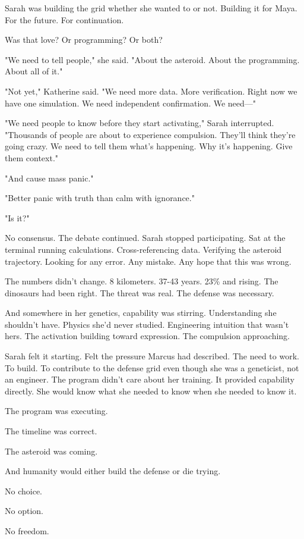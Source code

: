 Sarah was building the grid whether she wanted to or not. Building it for Maya. For the future. For continuation.

Was that love? Or programming? Or both?

"We need to tell people," she said. "About the asteroid. About the programming. About all of it."

"Not yet," Katherine said. "We need more data. More verification. Right now we have one simulation. We need independent confirmation. We need—"

"We need people to know before they start activating," Sarah interrupted. "Thousands of people are about to experience compulsion. They'll think they're going crazy. We need to tell them what's happening. Why it's happening. Give them context."

"And cause mass panic."

"Better panic with truth than calm with ignorance."

"Is it?"

No consensus. The debate continued. Sarah stopped participating. Sat at the terminal running calculations. Cross-referencing data. Verifying the asteroid trajectory. Looking for any error. Any mistake. Any hope that this was wrong.

The numbers didn't change. 8 kilometers. 37-43 years. 23\% and rising. The dinosaurs had been right. The threat was real. The defense was necessary.

And somewhere in her genetics, capability was stirring. Understanding she shouldn't have. Physics she'd never studied. Engineering intuition that wasn't hers. The activation building toward expression. The compulsion approaching.

Sarah felt it starting. Felt the pressure Marcus had described. The need to work. To build. To contribute to the defense grid even though she was a geneticist, not an engineer. The program didn't care about her training. It provided capability directly. She would know what she needed to know when she needed to know it.

The program was executing.

The timeline was correct.

The asteroid was coming.

And humanity would either build the defense or die trying.

No choice.

No option.

No freedom.

